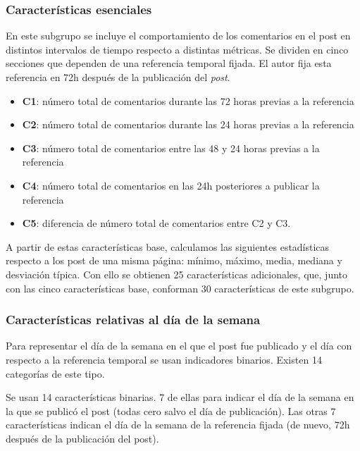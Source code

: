 \documentclass[11pt]{article}
\begin{document}
\subsubsection{Características esenciales}

En este subgrupo se incluye el comportamiento de los comentarios en el post en distintos intervalos de tiempo respecto a distintas métricas. Se dividen en cinco secciones que dependen de una referencia temporal fijada. El autor fija esta referencia en 72h después de la publicación del \emph{post}.

\begin{itemize}
  \item \textbf{C1}: número total de comentarios durante las 72 horas previas a la referencia

  \item \textbf{C2}: número total de comentarios durante las  24 horas previas a la referencia

  \item \textbf{C3}: número total de comentarios entre las 48 y 24 horas previas a la referencia

  \item \textbf{C4}: número total de comentarios en las 24h posteriores a publicar la referencia

  \item \textbf{C5}: diferencia de número total de comentarios entre C2 y C3.

\end{itemize}

A partir de estas características base, calculamos las siguientes estadísticas respecto a los post de una misma página:  mínimo, máximo, media, mediana y desviación típica. Con ello se obtienen 25 características adicionales, que, junto con las cinco características base, conforman 30 características de este subgrupo.

\subsubsection{Características relativas al día de la semana}

Para representar el día de la semana en el que el post fue publicado y el día con respecto a la referencia temporal se usan indicadores binarios. Existen 14 categorías de este tipo.

Se usan 14 características binarias. 7 de ellas para indicar el día de la semana en la que se publicó el post (todas cero salvo el día de publicación). Las otras 7 características indican el día de la semana de la referencia fijada (de nuevo, 72h después de la publicación del post).
\end{document}
